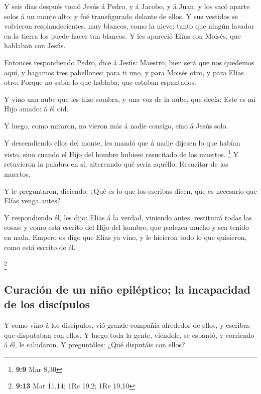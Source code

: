  Y seis días después tomó Jesús á Pedro, y á Jacobo, y á
Juan, y los sacó aparte solos á un monte alto; y fué transfigurado
delante de ellos.  Y sus vestidos se volvieron
resplandecientes, muy blancos, como la nieve; tanto que ningún lavador
en la tierra los puede hacer tan blancos.  Y les apareció
Elías con Moisés, que hablaban con Jesús.

 Entonces respondiendo Pedro, dice á Jesús: Maestro, bien
será que nos quedemos aquí, y hagamos tres pabellones: para ti uno, y
para Moisés otro, y para Elías otro;  Porque no sabía lo que
hablaba; que estaban espantados.

 Y vino una nube que les hizo sombra, y una voz de la nube,
que decía: Este es mi Hijo amado: á él oid.

 Y luego, como miraron, no vieron más á nadie consigo, sino
á Jesús solo.

 Y descendiendo ellos del monte, les mandó que á nadie
dijesen lo que habían visto, sino cuando el Hijo del hombre hubiese
resucitado de los muertos. \footnote{\textbf{9:9} Mar 8,30}
 Y retuvieron la palabra en sí, altercando qué sería
aquéllo: Resucitar de los muertos.

 Y le preguntaron, diciendo: ¿Qué es lo que los escribas
dicen, que es necesario que Elías venga antes?

 Y respondiendo él, les dijo: Elías á la verdad, viniendo
antes, restituirá todas las cosas: y como está escrito del Hijo del
hombre, que padezca mucho y sea tenido en nada.  Empero os
digo que Elías ya vino, y le hicieron todo lo que quisieron, como está
escrito de él.

\footnote{\textbf{9:13} Mat 11,14; 1Re 19,2; 1Re 19,10}

\hypertarget{curaciuxf3n-de-un-niuxf1o-epiluxe9ptico-la-incapacidad-de-los-discuxedpulos}{%
\subsection{Curación de un niño epiléptico; la incapacidad de los
discípulos}\label{curaciuxf3n-de-un-niuxf1o-epiluxe9ptico-la-incapacidad-de-los-discuxedpulos}}

 Y como vino á los discípulos, vió grande compañía
alrededor de ellos, y escribas que disputaban con ellos.  Y
luego toda la gente, viéndole, se espantó, y corriendo á él, le
saludaron.  Y preguntóles: ¿Qué disputáis con ellos?

